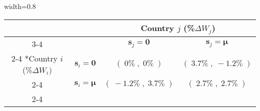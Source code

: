 \vspace{-0.2in}
\begin{center}
\setlength{\extrarowheight}{4pt}
\begin{adjustbox}{width=0.8\textwidth}
\begin{tabular}{*{4}{c|}}
\multicolumn{2}{c}{} & \multicolumn{2}{c}{Country $j$ (\%$\Delta W_j$)} \\
\cline{3-4}
\multicolumn{1}{c}{} &  & $\textbf{s}_j=\textbf{0}$ & $\textbf{s}_j=\boldsymbol{\mu}$ \\
\cline{2-4}       \multirow{2}*{Country $i$ (\%$\Delta W_i)$}  &
$\textbf{s}_i=\textbf{0}$ & $(\; 0\% \; , \; 0\% \;) $ & $(\;
3.7\% \; , \;-1.2\% \;)$ \\ \cline{2-4}
& $\textbf{s}_i=\boldsymbol{\mu}$ & $(\;
-1.2\% \; , \;3.7\% \;)$ &  $(\;2.7\% \; , \;2.7\% \;)$ \\ \cline{2-4}
\end{tabular}
\end{adjustbox}
\end{center}
